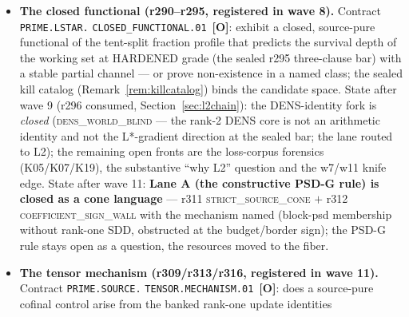 \documentclass[11pt]{article}
\newcommand{\mO}{\textcolor{openred}{\textbf{[O]}}}
\theoremstyle{definition}
\theoremstyle{remark}
\begin{document}
\begin{itemize}[leftmargin=2em]
\texttt{rh/problem/lstar\_problem.tex} (updated ``what is known'');
state after wave 11
(Section~\ref{sec:architecture-adjudication}): the surrounding
architecture is fully adjudicated (Lane A closed as cone language,
B not overtaking, C parked) and the \emph{formal} frame is
restructured --- the master theorem is now \emph{proved from} L*
$+$ terminal (\texttt{lstar\_terminal\_implies\_master}, r305), the
window source is a real Lean construction (r310/r310b), and the
contract stands as one of the two TRUE formal window-local holes
(sorries $9 \to 5$); state after wave 12
(Section~\ref{sec:forks-redteam}): the indefinite fork is
adjudicated --- the P1 index language is banked (a total
restatement, no lever), the P2 antiphase fingerprint is closed as
\textsc{algorithm\_artifact} by the r322 dig (the selection-geometry
question is the named residual), and the contract's Lean statement
class is red-team hardened (the r319 U-findings repaired by the
r320 retypes $+$ guards; the honest chain reading of
Remark~\ref{rem:honestchain} is binding).
\item \textbf{The closed functional (r290--r295, registered in wave
8).}  Contract \texttt{PRIME.LSTAR.}\allowbreak
\texttt{CLOSED\_FUNCTIONAL.01}~\mO: exhibit a closed, source-pure
functional of the tent-split fraction profile that predicts the
survival depth of the working set at HARDENED grade (the sealed r295
three-clause bar) with a stable partial channel --- or prove
non-existence in a named class; the sealed kill catalog
(Remark~\ref{rem:killcatalog}) binds the candidate space.  State
after wave 9 (r296 consumed, Section~\ref{sec:l2chain}): the
DENS-identity fork is \emph{closed} (\textsc{dens\_world\_blind} ---
the rank-2 DENS core is not an arithmetic identity and not the
L*-gradient direction at the sealed bar; the lane routed to L2); the
remaining open fronts are the loss-corpus forensics (K05/K07/K19),
the substantive ``why L2'' question and the w7/w11 knife edge.
State after wave 11: \textbf{Lane A (the constructive PSD-G rule)
is closed as a cone language} --- r311 \textsc{strict\_source\_cone}
$+$ r312 \textsc{coefficient\_sign\_wall} with the mechanism named
(block-psd membership without rank-one SDD, obstructed at the
budget/border sign); the PSD-G rule stays open as a question, the
resources moved to the fiber.
\item \textbf{The tensor mechanism (r309/r313/r316, registered in
wave 11).}  Contract \texttt{PRIME.SOURCE.}\allowbreak
\texttt{TENSOR.MECHANISM.01}~\mO: does a source-pure cofinal control
arise from the banked rank-one update identities

\end{itemize}
\end{document}
